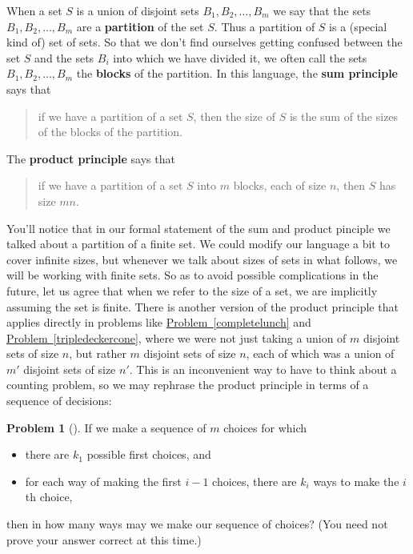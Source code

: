 \documentclass[10pt,]{book}
\newcommand{\terminology}[1]{\textbf{#1}}
\theoremstyle{plain}
\theoremstyle{definition}
\newtheorem{activity}[project]{Problem}
\theoremstyle{definition}
\numberwithin{equation}{chapter}
\begin{document}
\par
When a set \(S\) is a union of disjoint sets \(B_1, B_2, \ldots, B_m\) we say that the sets \(B_1, B_2, \ldots, B_m\) are a \terminology{partition} of the set \(S\). Thus a partition of \(S\) is a (special kind of) set of sets. So that we don't find ourselves getting confused between the set \(S\) and the sets \(B_i\) into which we have divided it, we often call the sets \(B_1, B_2,
\ldots, B_m\) the \terminology{blocks} of the partition. In this language, the \terminology{sum principle} says that%
\begin{quote}\hypertarget{blockquote-1}{}
if we have a partition of a set \(S\), then the size of \(S\) is the sum of the sizes of the blocks of the partition.%
\end{quote}
The \terminology{product principle} says that%
\begin{quote}\hypertarget{blockquote-2}{}
if we have a partition of a set \(S\) into \(m\) blocks, each of size \(n\), then \(S\) has size \(mn\).%
\end{quote}
You'll notice that in our formal statement of the sum and product pinciple we talked about a partition of a finite set. We could modify our language a bit to cover infinite sizes, but whenever we talk about sizes of sets in what follows, we will be working with finite sets. So as to avoid possible complications in the future, let us agree that when we refer to the size of a set, we are implicitly assuming the set is finite. There is another version of the product principle that applies directly in problems like \hyperref[completelunch]{Problem~\ref{completelunch}} and \hyperref[tripledeckercone]{Problem~\ref{tripledeckercone}}, where we were not just taking a union of \(m\) disjoint sets of size \(n\), but rather \(m\) disjoint sets of size \(n\), each of which was a union of \(m'\) disjoint sets of size \(n'\). This is an inconvenient way to have to think about a counting problem, so we may rephrase the product principle in terms of a sequence of decisions:%
\begin{activity}[] \label{generalproductprincipleintro}
If we make a sequence of \(m\) choices for which \leavevmode%
\begin{itemize}[label=\textbullet]
\item{}there are \(k_1\) possible first choices, and%
\item{}for each way of making the first \(i-1\) choices, there are \(k_i\) ways to make the \(i\)th choice,%
\end{itemize}
 then in how many ways may we make our sequence of choices? (You need not prove your answer correct at this time.)%
\end{activity}
\end{document}
